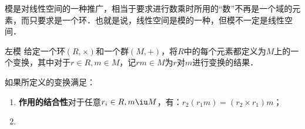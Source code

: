

模是对线性空间的一种推广，相当于要求进行数乘时所用的“数”不再是一个域的元素，而只要求是一个环．也就是说，线性空间是模的一种，但模不一定是线性空间．

\begin{definition}{左模}
给定一个环$(R, \times)$和一个群$(M, +)$，将$R$中的每个元素都定义为$M$上的一个变换，其中对于$r\in R, m\in M$，记$rm\in M$为$r$对$m$进行变换的结果．

如果所定义的变换满足：
\begin{enumerate}
\item \textbf{作用的结合性}对于任意$r_i\in R, m\iu M$，有：$r_2(r_1m)=(r_2\times r_1)m$；
\item \textbf{}
\end{enumerate}
\end{definition}









